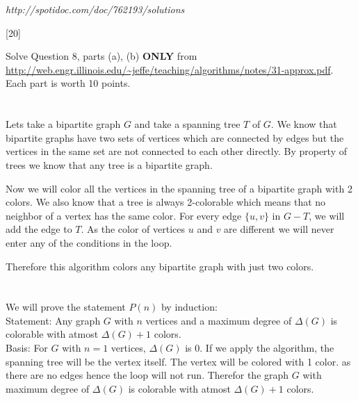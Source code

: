 \documentclass[addpoints]{exam}
\begin{document}
\begin{questions}
\begin{parts}
\begin{solution}
\emph{http://spotidoc.com/doc/762193/solutions}
\end{solution}

\end{parts}

[20]

Solve Question 8, parts (a), (b) \textbf{ONLY} from
\url{http://web.engr.illinois.edu/~jeffe/teaching/algorithms/notes/31-approx.pdf}. Each
part is worth 10 points. 
\begin{solution}
\begin{parts}
\part{} Lets take a bipartite graph $G$ and take a spanning tree $T$ of $G$. We know that bipartite graphs have two sets of vertices which are connected by edges but the vertices in the same set are not connected to each other directly. By property of trees we know that any tree is a bipartite graph.

Now we will color all the vertices in the   spanning tree of a bipartite graph with  2 colors. We also know that a tree is always 2-colorable which means that no neighbor of a vertex has the same color. For every edge $\{u,v\}$ in $G - T$, we will add the edge to $T$. As the color of vertices $u$ and $v$ are different we will never enter any of the conditions in the loop.

Therefore this algorithm colors any bipartite graph with just two colors.

\part{}
We will prove the statement $P(n)$ by induction:\\
Statement: Any graph $G$ with  $n$ vertices and a maximum degree of $\Delta(G)$ is colorable with atmost $\Delta(G)+1$ colors.\\

Basis: For $G$ with $n=1$ vertices, $\Delta(G)$ is 0. If we apply the algorithm, the spanning tree will be the vertex itself. The vertex will be colored with 1 color. as there are no edges hence the loop will not run. Therefor the graph $G$ with maximum degree of $\Delta(G)$ is colorable with atmost $\Delta(G)+1$ colors.\\


\end{parts}
\end{solution}
\end{questions}
\end{document}
